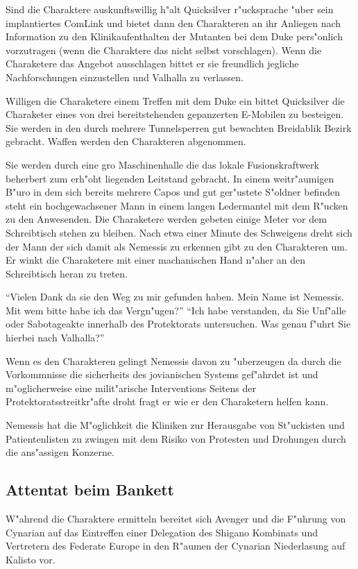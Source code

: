 Sind die Charaktere auskunftswillig h"alt Quicksilver r"ucksprache "uber sein implantiertes ComLink und bietet dann den Charakteren an ihr Anliegen nach Information zu den Klinikaufenthalten der Mutanten bei dem Duke pers"onlich vorzutragen (wenn die Charaktere das nicht selbst vorschlagen). Wenn die Charaketere das Angebot ausschlagen bittet er sie freundlich jegliche Nachforschungen einzustellen und Valhalla zu verlassen.

Willigen die Charaketere einem Treffen mit dem Duke ein bittet Quicksilver die Charaketer eines von drei bereitstehenden gepanzerten E-Mobilen zu besteigen. Sie werden in den durch mehrere Tunnelsperren gut bewachten Breidablik Bezirk gebracht. Waffen werden den Charakteren abgenommen.

Sie werden durch eine gro\3 Maschinenhalle die das lokale Fusionskraftwerk beherbert zum erh"oht liegenden Leitstand gebracht. In einem weitr"aumigen B"uro in dem sich bereits mehrere Capos und gut ger"ustete S"oldner befinden steht
ein hochgewachsener Mann in einem langen Ledermantel mit dem R"ucken zu den Anwesenden. Die Charaketere werden gebeten
einige Meter vor dem Schreibtisch stehen zu bleiben. Nach etwa einer Minute des Schweigens dreht sich der Mann der sich damit als Nemessis zu erkennen gibt zu den Charakteren um. Er winkt die Charaketere mit einer machanischen Hand n"aher an den Schreibtisch heran zu treten.

``Vielen Dank da\3 sie den Weg zu mir gefunden haben. Mein Name ist Nemessis. Mit wem bitte habe ich das Vergn"ugen?''
``Ich habe verstanden, da\3 Sie Unf"alle oder Sabotageakte innerhalb des Protektorats untersuchen. Was genau f"uhrt Sie hierbei nach Valhalla?''

Wenn es den Charakteren gelingt Nemessis davon zu "uberzeugen da\3 durch die Vorkommnisse die sicherheits des jovianischen Systems gef"ahrdet ist und m"oglicherweise eine milit"arische Interventions Seitens der Protektoratsstreitkr"afte droht fragt er wie er den Charaketern helfen kann.

Nemessis hat die M"oglichkeit die Kliniken zur Herausgabe von St"uckisten und Patientenlisten zu zwingen mit dem Risiko von Protesten und Drohungen durch die ans"assigen Konzerne.

\subsection{Attentat beim Bankett}

W"ahrend die Charaktere ermitteln bereitet sich Avenger und die F"uhrung von Cynarian auf das Eintreffen einer Delegation des Shigano Kombinats und Vertretern des Federate Europe in den R"aumen der Cynarian Niederlasung auf Kalisto vor.

